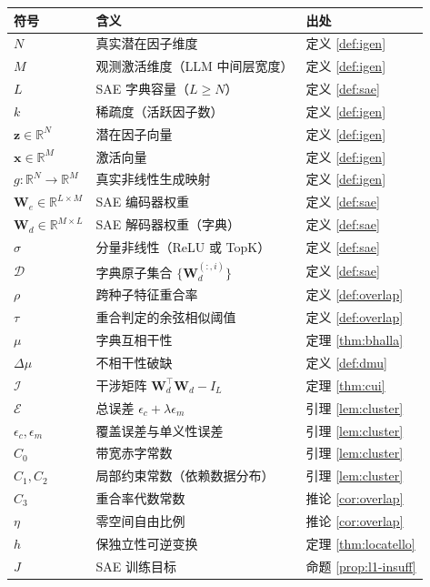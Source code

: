 \documentclass[11pt,a4paper]{article}
\theoremstyle{remark}
\newcommand{\R}{\mathbb{R}}
\newcommand{\Z}{\bm{z}}
\newcommand{\X}{\bm{x}}
\newcommand{\W}{\bm{W}}
\newcommand{\I}{\mathcal{I}}
\newcommand{\Dict}{\mathcal{D}}
\newcommand{\Err}{\mathcal{E}}
\begin{document}
\begin{center}
\begin{tabular}{lll}
\toprule
\textbf{符号} & \textbf{含义} & \textbf{出处} \\
\midrule
$N$ & 真实潜在因子维度 & 定义 \ref{def:igen} \\
$M$ & 观测激活维度（LLM 中间层宽度） & 定义 \ref{def:igen} \\
$L$ & SAE 字典容量（$L \geq N$） & 定义 \ref{def:sae} \\
$k$ & 稀疏度（活跃因子数） & 定义 \ref{def:igen} \\
$\Z \in \R^N$ & 潜在因子向量 & 定义 \ref{def:igen} \\
$\X \in \R^M$ & 激活向量 & 定义 \ref{def:igen} \\
$g: \R^N \to \R^M$ & 真实非线性生成映射 & 定义 \ref{def:igen} \\
$\W_e \in \R^{L \times M}$ & SAE 编码器权重 & 定义 \ref{def:sae} \\
$\W_d \in \R^{M \times L}$ & SAE 解码器权重（字典） & 定义 \ref{def:sae} \\
$\sigma$ & 分量非线性（ReLU 或 TopK） & 定义 \ref{def:sae} \\
$\Dict$ & 字典原子集合 $\{\W_d^{(:,i)}\}$ & 定义 \ref{def:sae} \\
$\rho$ & 跨种子特征重合率 & 定义 \ref{def:overlap} \\
$\tau$ & 重合判定的余弦相似阈值 & 定义 \ref{def:overlap} \\
$\mu$ & 字典互相干性 & 定理 \ref{thm:bhalla} \\
$\Delta\mu$ & 不相干性破缺 & 定义 \ref{def:dmu} \\
$\I$ & 干涉矩阵 $\W_d^\top \W_d - I_L$ & 定理 \ref{thm:cui} \\
$\Err$ & 总误差 $\epsilon_c + \lambda \epsilon_m$ & 引理 \ref{lem:cluster} \\
$\epsilon_c, \epsilon_m$ & 覆盖误差与单义性误差 & 引理 \ref{lem:cluster} \\
$C_0$ & 带宽赤字常数 & 引理 \ref{lem:cluster} \\
$C_1, C_2$ & 局部约束常数（依赖数据分布） & 引理 \ref{lem:cluster} \\
$C_3$ & 重合率代数常数 & 推论 \ref{cor:overlap} \\
$\eta$ & 零空间自由比例 & 推论 \ref{cor:overlap} \\
$h$ & 保独立性可逆变换 & 定理 \ref{thm:locatello} \\
$J$ & SAE 训练目标 & 命题 \ref{prop:l1-insuff} \\
\bottomrule
\end{tabular}
\end{center}
\end{document}
